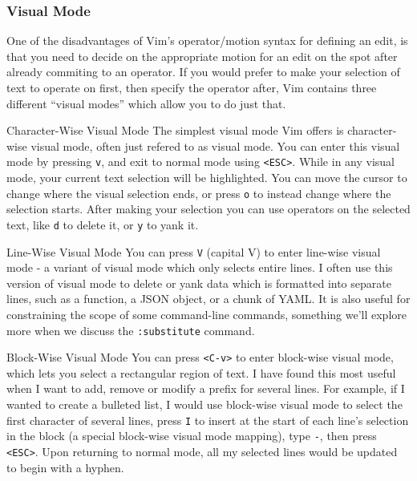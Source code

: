 \documentclass{beamer}
\begin{document}
\begin{frame}[fragile]
    \frametitle{Visual Mode}
    \small
    One of the disadvantages of Vim's operator/motion syntax for defining an edit, is that you need to decide on the appropriate motion for an edit on the spot after already commiting to an operator. If you would prefer to make your selection of text to operate on first, then specify the operator after, Vim contains three different \enquote{visual modes} which allow you to do just that.
    \vspace{0.5cm}
    \begin{block}{Character-Wise Visual Mode}
	The simplest visual mode Vim offers is character-wise visual mode, often just refered to as visual mode. You can enter this visual mode by pressing \verb+v+, and exit to normal mode using \verb+<ESC>+. While in any visual mode, your current text selection will be highlighted. You can move the cursor to change where the visual selection ends, or press \verb+o+ to instead change where the selection starts. After making your selection you can use operators on the selected text, like \verb+d+ to delete it, or \verb+y+ to yank it.
    \end{block}
\end{frame}

\begin{frame}[fragile]
    \small
    \begin{block}{Line-Wise Visual Mode}
	You can press \verb+V+ (capital V) to enter line-wise visual mode - a variant of visual mode which only selects entire lines. I often use this version of visual mode to delete or yank data which is formatted into separate lines, such as a function, a JSON object, or a chunk of YAML. It is also useful for constraining the scope of some command-line commands, something we'll explore more when we discuss the \verb+:substitute+ command.
    \end{block}
    \begin{block}{Block-Wise Visual Mode}
	You can press \verb+<C-v>+ to enter block-wise visual mode, which lets you select a rectangular region of text. I have found this most useful when I want to add, remove or modify a prefix for several lines. For example, if I wanted to create a bulleted list, I would use block-wise visual mode to select the first character of several lines, press \verb+I+ to insert at the start of each line's selection in the block (a special block-wise visual mode mapping), type \verb+-+, then press \verb+<ESC>+. Upon returning to normal mode, all my selected lines would be updated to begin with a hyphen.
    \end{block}
\end{frame}
\end{document}
